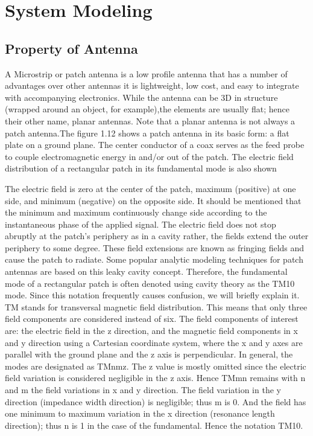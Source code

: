 \documentclass[12pt]{article}
\begin{document}
%
\cleardoublepage
 
\section{System Modeling}\label{sec:System Modeling}
 \subsection{Property of Antenna}\label{sub:Property of Antenna}
  \justify
   A Microstrip or patch antenna is a low profile antenna that has a number of advantages  over other antennas it is lightweight, low cost, and easy to integrate with accompanying  electronics. While the antenna can be 3D in structure (wrapped around an object, for example),the elements are usually flat; hence their other name, planar antennas. Note that a planar antenna is not always a patch antenna.The figure 1.12 shows a patch antenna in its basic form: a flat plate on a ground plane. The center conductor of a coax serves as the feed probe to couple electromagnetic energy in and/or out of the patch. The electric field distribution of a rectangular patch in its fundamental mode is also shown

  \justify
   The electric field is zero at the center of the patch, maximum (positive) at one side, and minimum (negative) on the opposite side. It should be mentioned that the minimum and maximum continuously change side according to the instantaneous phase of the applied signal. The electric field does not stop abruptly at the patch's periphery as in a cavity rather, the fields extend the outer periphery to some degree. These field extensions are known as fringing fields and cause the patch to radiate. Some popular analytic modeling techniques for patch antennas are based on this leaky cavity concept. Therefore, the fundamental mode of a rectangular patch is often denoted using cavity theory as the TM10 mode.
 \justify
   Since this notation frequently causes confusion, we will briefly explain it. TM stands for transversal  magnetic field distribution. This means that only three field components are considered instead of six. The field components of interest are: the electric field in the z direction, and the magnetic field components in x and y direction using a Cartesian coordinate system, where the x and y axes are parallel with the ground plane and the z axis is perpendicular. In general, the modes are designated as TMnmz. The z value is mostly omitted since the electric field variation is considered negligible in the z axis. Hence TMmn remains with n and m the field variations in x and y direction. The field variation in the y direction (impedance width direction) is negligible; thus m is 0. And the field has one minimum to maximum variation in the x direction (resonance length direction); thus n is 1 in the case of the fundamental. Hence the notation TM10.
\end{document}
